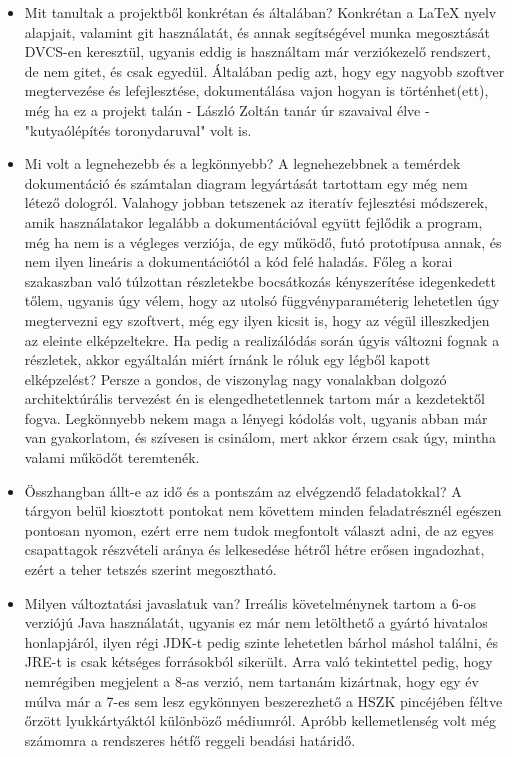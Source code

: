 \begin{itemize}

\item Mit tanultak a projektből konkrétan és általában? \newline
Konkrétan a \LaTeX{} nyelv alapjait, valamint git használatát, és annak segítségével munka megosztását DVCS-en keresztül, ugyanis eddig is használtam már verziókezelő rendszert, de nem gitet, és csak egyedül. Általában pedig azt, hogy egy nagyobb szoftver megtervezése és lefejlesztése, dokumentálása vajon hogyan is történhet(ett), még ha ez a projekt talán - László Zoltán tanár úr szavaival élve - "kutyaólépítés toronydaruval" volt is.

\item Mi volt a legnehezebb és a legkönnyebb? \newline
A legnehezebbnek a temérdek dokumentáció és számtalan diagram legyártását tartottam egy még nem létező dologról. Valahogy jobban tetszenek az iteratív fejlesztési módszerek, amik használatakor legalább a dokumentációval együtt fejlődik a program, még ha nem is a végleges verziója, de egy működő, futó prototípusa annak, és nem ilyen lineáris a dokumentációtól a kód felé haladás. Főleg a korai szakaszban való túlzottan részletekbe bocsátkozás kényszerítése idegenkedett tőlem, ugyanis úgy vélem, hogy az utolsó függvényparaméterig lehetetlen úgy megtervezni egy szoftvert, még egy ilyen kicsit is, hogy az végül illeszkedjen az eleinte elképzeltekre. Ha pedig a realizálódás során úgyis változni fognak a részletek, akkor egyáltalán miért írnánk le róluk egy légből kapott elképzelést? Persze a gondos, de viszonylag nagy vonalakban dolgozó architektúrális tervezést én is elengedhetetlennek tartom már a kezdetektől fogva.
Legkönnyebb nekem maga a lényegi kódolás volt, ugyanis abban már van gyakorlatom, és szívesen is csinálom, mert akkor érzem csak úgy, mintha valami működőt teremtenék.

\item Összhangban állt-e az idő és a pontszám az elvégzendő feladatokkal? \newline
A tárgyon belül kiosztott pontokat nem követtem minden feladatrésznél egészen pontosan nyomon, ezért erre nem tudok megfontolt választ adni, de az egyes csapattagok részvételi aránya és lelkesedése hétről hétre erősen ingadozhat, ezért a teher tetszés szerint megosztható.

\item Milyen változtatási javaslatuk van? \newline
Irreális követelménynek tartom a 6-os verziójú Java használatát, ugyanis ez már nem letölthető a gyártó hivatalos honlapjáról, ilyen régi JDK-t pedig szinte lehetetlen bárhol máshol találni, és JRE-t is csak kétséges forrásokból sikerült. Arra való tekintettel pedig, hogy nemrégiben megjelent a 8-as verzió, nem tartanám kizártnak, hogy egy év múlva már a 7-es sem lesz egykönnyen beszerezhető a HSZK pincéjében féltve őrzött lyukkártyáktól különböző médiumról.
Apróbb kellemetlenség volt még számomra a rendszeres hétfő reggeli beadási határidő.


\end{itemize}
